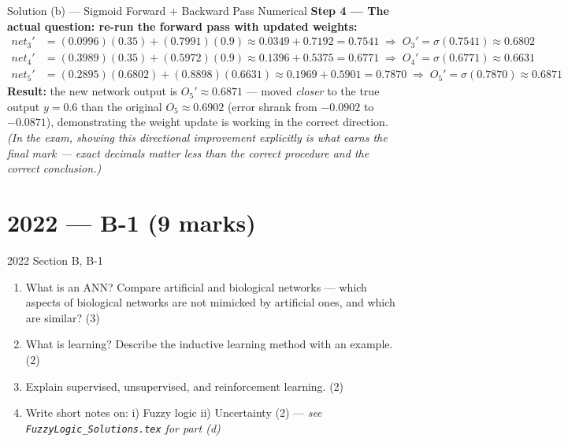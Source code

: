 \documentclass[12pt,a4paper]{article}
\begin{document}
\begin{solbox}{Solution (b) --- Sigmoid Forward + Backward Pass Numerical}
\textbf{Step 4 --- The actual question: re-run the forward pass with updated weights:}
\begin{align*}
net_3' &= (0.0996)(0.35)+(0.7991)(0.9) \approx 0.0349+0.7192 = 0.7541 \;\Rightarrow\; O_3' = \sigma(0.7541)\approx 0.6802\\
net_4' &= (0.3989)(0.35)+(0.5972)(0.9) \approx 0.1396+0.5375 = 0.6771 \;\Rightarrow\; O_4' = \sigma(0.6771)\approx 0.6631\\
net_5' &= (0.2895)(0.6802)+(0.8898)(0.6631) \approx 0.1969+0.5901 = 0.7870 \;\Rightarrow\; O_5' = \sigma(0.7870)\approx 0.6871
\end{align*}
\textbf{Result:} the new network output is $O_5' \approx 0.6871$ --- moved \emph{closer} to the true output $y=0.6$ than the original $O_5\approx 0.6902$ (error shrank from $-0.0902$ to $-0.0871$), demonstrating the weight update is working in the correct direction. \emph{(In the exam, showing this directional improvement explicitly is what earns the final mark — exact decimals matter less than the correct procedure and the correct conclusion.)}
\end{solbox}

\newpage
\section{2022 --- B-1 (9 marks)}

\begin{qbox}{2022 Section B, B-1}
\begin{enumerate}[label=(\alph*)]
  \item What is an ANN? Compare artificial and biological networks --- which aspects of biological networks are not mimicked by artificial ones, and which are similar? (3)
  \item What is learning? Describe the inductive learning method with an example. (2)
  \item Explain supervised, unsupervised, and reinforcement learning. (2)
  \item Write short notes on: i) Fuzzy logic ii) Uncertainty (2) --- \textit{see \texttt{FuzzyLogic\_Solutions.tex} for part (d)}
\end{enumerate}
\end{qbox}
\end{document}
